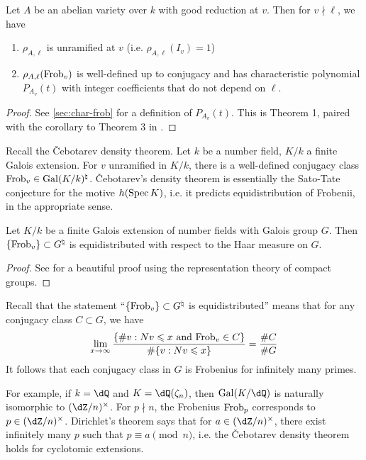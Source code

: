 \begin{theorem}\label{thm:ab-var-good}
Let $A$ be an abelian variety over $k$ with good reduction at $v$. Then for 
$v\nmid \ell$, we have  
\begin{enumerate}
  \item $\rho_{A,\ell}$ is unramified at $v$ (i.e. $\rho_{A,\ell}(I_v) = 1$) 
  \item $\rho_{A,\ell}(\mathrm{Frob}_v)$ is well-defined up to conjugacy and has 
    characteristic polynomial $P_{A_v}(t)$ with integer coefficients that do 
    not depend on $\ell$. 
\end{enumerate}
\end{theorem}
\begin{proof}
See \ref{sec:char-frob} for a definition of $P_{A_v}(t)$. This is Theorem 1, 
paired with the corollary to Theorem 3 in \cite{st68}. 
\end{proof}

Recall the \v Cebotarev density theorem. Let $k$ be a number field, $K/k$ a 
finite Galois extension. For $v$ unramified in $K/k$, there is a well-defined 
conjugacy class $\mathrm{Frob}_v\in \operatorname{Gal}(K/k)^\natural$. \v Cebotarev's density theorem 
is essentially the Sato-Tate conjecture for the motive 
$h(\operatorname{Spec} K)$, i.e. it predicts equidistribution of Frobenii, in the appropriate 
sense. 

\begin{theorem}[\v Cebotarev]
Let $K/k$ be a finite Galois extension of number fields with Galois group $G$. Then 
$\{\mathrm{Frob}_v\}\subset G^\natural$ is equidistributed with respect to the Haar 
measure on $G$. 
\end{theorem}
\begin{proof}
See \cite[1.2.2]{se68} for a beautiful proof using the representation theory of 
compact groups. 
\end{proof}

Recall that the statement ``$\{\mathrm{Frob}_v\}\subset G^\natural$ is 
equidistributed'' means that for any conjugacy class $C\subset G$, we have 
\[
  \lim_{x \to \infty} \frac{\{\# v : N v \leqslant x \text{ and } \mathrm{Frob}_v\in C\}}{\# \{v:N v\leqslant x\}} = \frac{\# C}{\# G}
\]
It follows that each conjugacy class in $G$ is Frobenius for infinitely many 
primes.  

For example, if $k=\dQ$ and $K=\dQ(\zeta_n)$, then $\gal(K/\dQ)$ is naturally 
isomorphic to $(\dZ/n)^\times$. For $p\nmid n$, the Frobenius $\mathrm{Frob}_p$ 
corresponds to $p\in (\dZ/n)^\times$. Dirichlet's theorem says that for 
$a\in (\dZ/n)^\times$, there exist infinitely many $p$ such that 
$p\equiv a\pmod n$, i.e. the \v Cebotarev density theorem holds for cyclotomic 
extensions. 

